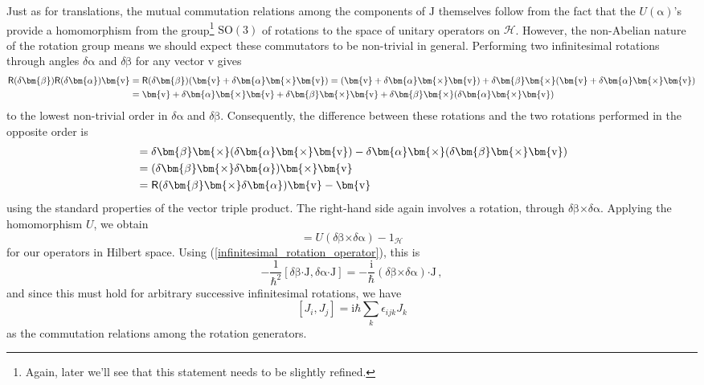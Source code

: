 \documentclass{article}
\theoremstyle{plain}\theoremheaderfont{\normalfont\itshape}\theorembodyfont{\rmfamily}\theoremseparator{.}\newtheorem*{rem}{Remark}\newtheorem*{ex}{Example}\newtheorem*{proof}{Proof}\newtheorem*{altp}{Alternative proof}
\theoremstyle{plain}\theoremheaderfont{\normalfont\bfseries}\theorembodyfont{\rmfamily}\theoremseparator{.}\newtheorem{thm}{Theorem}[section]\newtheorem{lem}[thm]{Lemma}\newtheorem{prop}[thm]{Proposition}\newtheorem*{cor}{Corollary}\newtheorem{defn}[thm]{Definition}\newtheorem{clm}[thm]{Claim}\newtheorem{clminproof}{Claim}
\theoremstyle{break}\theoremheaderfont{\normalfont\itshape}\theorembodyfont{\rmfamily}\theoremseparator{.\medskip}\newtheorem*{proofskip}{Proof}\newtheorem*{exs}{Examples}\newtheorem*{rems}{Remarks}
\theoremstyle{break}\theoremheaderfont{\normalfont\bfseries}\theorembodyfont{\rmfamily}\theoremseparator{.\medskip}\newtheorem{lemskip}[thm]{Lemma}\newtheorem{defnskip}[thm]{Definition}\newtheorem{propskip}[thm]{Proposition}\newtheorem{thmskip}[thm]{Theorem}
\numberwithin{equation}{section}
\newcommand{\ii}{\mathrm{i}}
\newcommand{\vb}[1]{\bm{\mathrm{#1}}}
\newcommand{\cross}{\bm{\times}}
\newcommand{\vdot}{\bm{\cdot}}
\newcommand{\hb}{\mathcal{H}}
\newcommand{\SO}{\mathrm{SO}}
\begin{document}
    Just as for translations, the mutual commutation relations among the components of \(\vb{J}\) themselves follow from the fact that the \(U(\vb{\alpha})\)'s provide a homomorphism from the group\footnote{Again, later we'll see that this statement needs to be slightly refined.} \(\SO(3)\) of rotations to the space of unitary operators on \(\hb\). However, the non-Abelian nature of the rotation group means we should expect these commutators to be non-trivial in general. Performing two infinitesimal rotations through angles \(\delta\vb{\alpha}\) and \(\delta\vb{\beta}\) for any vector \(\vb{v}\) gives
    \begin{align}
        \mathsf{R}(\delta\vb{\beta})\mathsf{R}(\delta\vb{\alpha})\vb{v}&=\mathsf{R}(\delta\vb{\beta})(\vb{v}+\delta\vb{\alpha}\cross\vb{v})=(\vb{v}+\delta\vb{\alpha}\cross\vb{v})+\delta\vb{\beta}\cross(\vb{v}+\delta\vb{\alpha}\cross\vb{v})\notag\\
        &=\vb{v}+\delta\vb{\alpha}\cross\vb{v}+\delta\vb{\beta}\cross\vb{v}+\delta\vb{\beta}\cross(\delta\vb{\alpha}\cross\vb{v})
    \end{align}
    to the lowest non-trivial order in \(\delta\vb{\alpha}\) and \(\delta\vb{\beta}\). Consequently, the difference between these rotations and the two rotations performed in the opposite order is
    \begin{align}
        [\mathsf{R}(\delta\vb{\beta})\mathsf{R}(\delta\vb{\alpha})-\mathsf{R}(\delta\vb{\alpha})\mathsf{R}(\delta\vb{\beta})]&=\delta\vb{\beta}\cross(\delta\vb{\alpha}\cross\vb{v})-\delta\vb{\alpha}\cross(\delta\vb{\beta}\cross\vb{v})\notag\\
        &=(\delta\vb{\beta}\cross\delta\vb{\alpha})\cross\vb{v}\notag\\
        &=\mathsf{R}(\delta\vb{\beta}\cross\delta\vb{\alpha})\vb{v}-\vb{v}
    \end{align}
    using the standard properties of the vector triple product. The right-hand side again involves a rotation, through \(\delta\vb{\beta}\cross\delta\vb{\alpha}\). Applying the homomorphism \(U\), we obtain
    \begin{equation}
        [U(\delta\vb{\beta}),U(\delta\vb{\alpha})]=U(\delta\vb{\beta}\cross\delta\vb{\alpha})-1_{\hb}
    \end{equation}
    for our operators in Hilbert space. Using (\ref{infinitesimal_rotation_operator}), this is
    \begin{equation}
        -\frac{1}{\hbar^2}[\delta\vb{\beta}\vdot\vb{J},\delta\vb{\alpha}\vdot\vb{J}]=-\frac{\ii}{\hbar}(\delta\vb{\beta}\cross\delta\vb{\alpha})\vdot\vb{J}\,,
    \end{equation}
    and since this must hold for arbitrary successive infinitesimal rotations, we have
    \begin{equation}\label{angular_momentum_commutation}
        [J_i,J_j]=\ii\hbar\sum_k\epsilon_{ijk}J_k
    \end{equation}
    as the commutation relations among the rotation generators.
\end{document}
